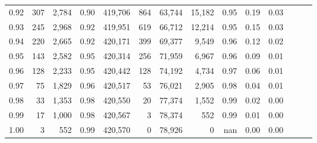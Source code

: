 \begin{tabular}{rrrrrrrrrrrrrr}
0.92 &    307 &  2,784 &  0.90 &  419,706 &      864 &  63,744 &  15,182 &  0.95 &  0.19 &      0.03 \\
0.93 &    245 &  2,968 &  0.92 &  419,951 &      619 &  66,712 &  12,214 &  0.95 &  0.15 &      0.03 \\
0.94 &    220 &  2,665 &  0.92 &  420,171 &      399 &  69,377 &   9,549 &  0.96 &  0.12 &      0.02 \\
0.95 &    143 &  2,582 &  0.95 &  420,314 &      256 &  71,959 &   6,967 &  0.96 &  0.09 &      0.01 \\
0.96 &    128 &  2,233 &  0.95 &  420,442 &      128 &  74,192 &   4,734 &  0.97 &  0.06 &      0.01 \\
0.97 &     75 &  1,829 &  0.96 &  420,517 &       53 &  76,021 &   2,905 &  0.98 &  0.04 &      0.01 \\
0.98 &     33 &  1,353 &  0.98 &  420,550 &       20 &  77,374 &   1,552 &  0.99 &  0.02 &      0.00 \\
0.99 &     17 &  1,000 &  0.98 &  420,567 &        3 &  78,374 &     552 &  0.99 &  0.01 &      0.00 \\
1.00 &      3 &    552 &  0.99 &  420,570 &        0 &  78,926 &       0 &   nan &  0.00 &      0.00 \\
\bottomrule
\end{tabular}
